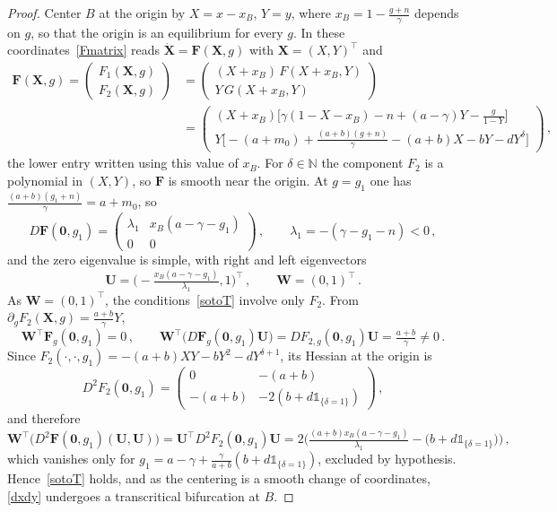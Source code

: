 \documentclass[reqno,11pt]{amsart}
\numberwithin{equation}{section}
\newcommand{\N}{\mathbb{N}}
\begin{document}
\begin{proof}
Center $B$ at the origin by $X=x-x_B$, $Y=y$, where $x_B=1-\tfrac{g+n}{\gamma}$ depends on $g$, so that the origin is an equilibrium for every $g$. In these coordinates~\eqref{Fmatrix} reads $\dot{\mathbf X}=\mathbf F(\mathbf X,g)$ with $\mathbf X=(X,Y)^\top$ and
\begin{align*}
\mathbf F(\mathbf X,g)=\begin{pmatrix}F_1(\mathbf X,g)\\ F_2(\mathbf X,g)\end{pmatrix}
&=\begin{pmatrix}(X+x_B)\,F(X+x_B,Y)\\ Y\,G(X+x_B,Y)\end{pmatrix}\\[2pt]
&=\begin{pmatrix}(X+x_B)\big[\gamma(1-X-x_B)-n+(a-\gamma)Y-\tfrac{g}{1-Y}\big]\\[4pt]
Y\big[-(a+m_0)+\tfrac{(a+b)(g+n)}{\gamma}-(a+b)X-bY-dY^{\delta}\big]\end{pmatrix}\,,
\end{align*}
the lower entry written using this value of $x_B$.
For $\delta\in\N$ the component $F_2$ is a polynomial in $(X,Y)$, so $\mathbf F$ is smooth near the origin. At $g=g_1$ one has $\tfrac{(a+b)(g_1+n)}{\gamma}=a+m_0$, so
\[
D\mathbf F(\mathbf 0,g_1)=\begin{pmatrix}\lambda_1 & x_B(a-\gamma-g_1)\\ 0 & 0\end{pmatrix}\,,\qquad \lambda_1=-(\gamma-g_1-n)<0\,,
\]
and the zero eigenvalue is simple, with right and left eigenvectors
\[
\mathbf U=\Big(-\tfrac{x_B(a-\gamma-g_1)}{\lambda_1},1\Big)^\top\,,\qquad \mathbf W=(0,1)^\top\,.
\]
As $\mathbf W=(0,1)^\top$, the conditions~\eqref{sotoT} involve only $F_2$. From $\partial_g F_2(\mathbf X,g)=\tfrac{a+b}{\gamma}Y$,
\[
\mathbf W^\top\mathbf F_g(\mathbf 0,g_1)=0\,,\qquad
\mathbf W^\top\big(D\mathbf F_g(\mathbf 0,g_1)\mathbf U\big)=DF_{2,g}(\mathbf 0,g_1)\mathbf U=\tfrac{a+b}{\gamma}\neq0\,.
\]
Since $F_2(\cdot,\cdot,g_1)=-(a+b)XY-bY^2-dY^{\delta+1}$, its Hessian at the origin is
\[
D^2F_2(\mathbf 0,g_1)=\begin{pmatrix}0&-(a+b)\\-(a+b)&-2(b+d\mathds 1_{\{\delta=1\}})\end{pmatrix}\,,
\]
and therefore
\[
\mathbf W^\top\big(D^2\mathbf F(\mathbf 0,g_1)(\mathbf U,\mathbf U)\big)=\mathbf U^\top D^2F_2(\mathbf 0,g_1)\mathbf U=2\Big(\tfrac{(a+b)x_B(a-\gamma-g_1)}{\lambda_1}-\big(b+d\mathds 1_{\{\delta=1\}}\big)\Big)\,,
\]
which vanishes only for $g_1=a-\gamma+\tfrac{\gamma}{a+b}(b+d\mathds 1_{\{\delta=1\}})$, excluded by hypothesis. Hence~\eqref{sotoT} holds, and as the centering is a smooth change of coordinates, \eqref{dxdy} undergoes a transcritical bifurcation at $B$.
\end{proof}
\end{document}
